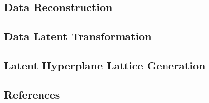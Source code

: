 \documentclass{article} %
\begin{document}
\subsection{Data Reconstruction}
\subsection{Data Latent Transformation}
\subsection{Latent Hyperplane Lattice Generation}


\subsection{References}


\end{document}

